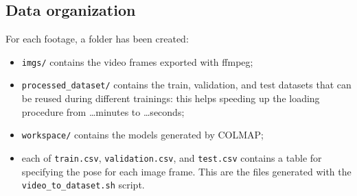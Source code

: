 \subsection{Data organization}
For each footage, a folder has been created:
\begin{itemize}
    \item \texttt{imgs/} contains the video frames exported with ffmpeg;
    \item \texttt{processed\_dataset/} contains the train, validation, and test datasets that can be reused during different trainings: this helps speeding up the loading procedure from \dots minutes to \dots seconds;
    \item \texttt{workspace/} contains the models generated by COLMAP;
    \item each of \texttt{train.csv}, \texttt{validation.csv}, and \texttt{test.csv} contains a table for specifying the pose for each image frame. This are the files generated with the \texttt{video\_to\_dataset.sh} script.
\end{itemize}
